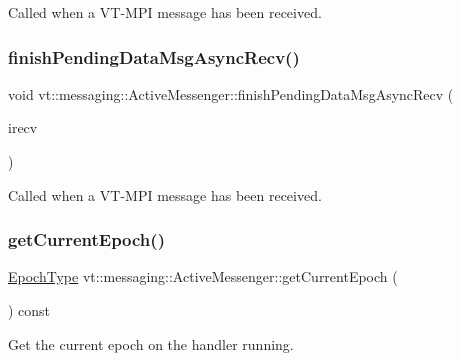 Called when a V\+T-\/\+M\+PI message has been received. 

\mbox{\label{structvt_1_1messaging_1_1_active_messenger_a80a13017308870133ff8538741bee394}} 
\subsubsection{\texorpdfstring{finish\+Pending\+Data\+Msg\+Async\+Recv()}{finishPendingDataMsgAsyncRecv()}}
{\footnotesize\ttfamily void vt\+::messaging\+::\+Active\+Messenger\+::finish\+Pending\+Data\+Msg\+Async\+Recv (\begin{DoxyParamCaption}\item[{\hyperlink{structvt_1_1messaging_1_1_in_progress_data_i_recv}{In\+Progress\+Data\+I\+Recv} $\ast$}]{irecv }\end{DoxyParamCaption})\hspace{0.3cm}{\ttfamily [private]}}



Called when a V\+T-\/\+M\+PI message has been received. 

\mbox{\label{structvt_1_1messaging_1_1_active_messenger_a5910d45e103a4c0e9c3a69084a58caac}} 
\subsubsection{\texorpdfstring{get\+Current\+Epoch()}{getCurrentEpoch()}}
{\footnotesize\ttfamily \hyperlink{namespacevt_a985a5adf291c34a3ca263b3378388236}{Epoch\+Type} vt\+::messaging\+::\+Active\+Messenger\+::get\+Current\+Epoch (\begin{DoxyParamCaption}{ }\end{DoxyParamCaption}) const}



Get the current epoch on the handler running. 

